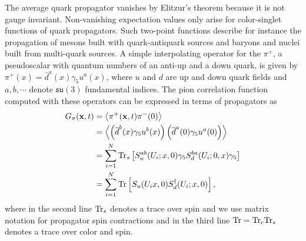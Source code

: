 The average quark propagator vanishes by Elitzur's theorem because it is not gauge invariant.
Non-vanishing expectation values only arise for color-singlet functions of quark propagators.
Such two-point functions describe for instance the propagation of mesons built with quark-antiquark sources and baryons and nuclei built from multi-quark sources.
A simple interpolating operator for the $\pi^+$, a pseudoscalar with quantum numbers of an anti-up and a down quark, is given by $\pi^+(x) = \bar{d}^a(x) \gamma_5 u^a(x)$,
where $u$ and $d$ are up and down quark fields and $a,b,\cdots$ denote $\mathfrak{su}(3)$ fundamental indices.
The pion correlation function computed with these operators can be expressed in terms of propagators as
\begin{equation}
  \begin{split}
    G_\pi(\mathbf{x},t) &= \left< \pi^+(\mathbf{x},t)\pi^-(0) \right>\\
    &= \left< \left( \overline{d}^b(x)\gamma_5 u^b(x)\right) \left( \overline{d}^a(0)\gamma_5 u^a(0) \right) \right>\\
    &= \sum_{i=1}^N \text{Tr}_s \left[S_u^{ab}(U_i;x,0)\gamma_5 S_d^{ba}(U_i;0,x)\gamma_5\right]\\
    &= \sum_{i=1}^N \text{Tr}\left[ S_u(U_ix,0) S_d^\dagger(U_i;x,0) \right],
  \end{split}\label{picorrden}
\end{equation}
where in the second line $\text{Tr}_s$ denotes a trace over spin and we use matrix notation for propagator spin contractions and in the third line $\text{Tr} = \text{Tr}_c \text{Tr}_s$ denotes a trace over color and spin. 

